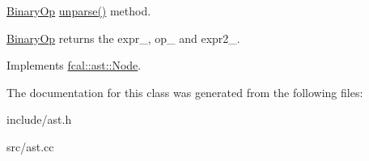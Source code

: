 \hyperlink{classfcal_1_1ast_1_1BinaryOp}{Binary\+Op} \hyperlink{classfcal_1_1ast_1_1BinaryOp_a7f019bd362a138dd80450dfdafd2325a}{unparse()} method. 

\hyperlink{classfcal_1_1ast_1_1BinaryOp}{Binary\+Op} returns the expr\+\_\+, op\+\_\+ and expr2\+\_\+. 

Implements \hyperlink{classfcal_1_1ast_1_1Node_a81865f5a1df593708a39bf492952742a}{fcal\+::ast\+::\+Node}.



The documentation for this class was generated from the following files\+:\begin{DoxyCompactItemize}
\item 
include/ast.\+h\item 
src/ast.\+cc\end{DoxyCompactItemize}

